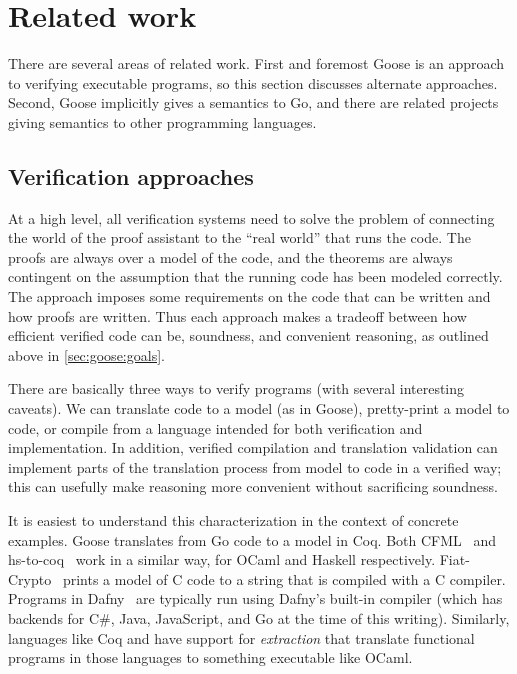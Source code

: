 \section{Related work}%
\label{sec:goose:rel-work}

There are several areas of related work. First and foremost Goose is an approach
to verifying executable programs, so this section discusses alternate
approaches. Second, Goose implicitly gives a semantics to Go, and there are
related projects giving semantics to other programming languages.

\subsection{Verification approaches}

At a high level, all verification systems need to solve the problem of
connecting the world of the proof assistant to the ``real world'' that runs the
code. The proofs are always over a model of the code, and the theorems are
always contingent on the assumption that the running code has been modeled correctly. The approach
imposes some requirements on the code that can be written and how proofs are
written. Thus each approach makes a tradeoff between how efficient verified code
can be, soundness, and
convenient reasoning, as outlined above in \cref{sec:goose:goals}.

There are basically three ways to verify programs (with several interesting
caveats). We can translate code to a model (as in Goose), pretty-print a
model to code, or compile from a language intended for both verification and
implementation. In addition, verified compilation and translation validation can
implement parts of the translation process from model to code in a verified way;
this can usefully make reasoning more convenient without sacrificing soundness.

It is easiest to understand this characterization in the context of concrete
examples. Goose translates from Go code to a model in Coq. Both
CFML~\cite{chargueraud:cfml} and hs-to-coq~\cite{spector-zabusky:hstocoq} work
in a similar way, for OCaml and Haskell respectively.
Fiat-Crypto~\cite{erbsen:fiat-crypto} prints a model of C code to a string that
is compiled with a C compiler. Programs in Dafny~\cite{leino:dafny} are
typically run using Dafny's built-in compiler (which has backends for C\#, Java,
JavaScript, and Go at the time of this writing). Similarly, languages like Coq
and \fstar have support for \emph{extraction} that translate functional programs
in those languages to something executable like OCaml.

